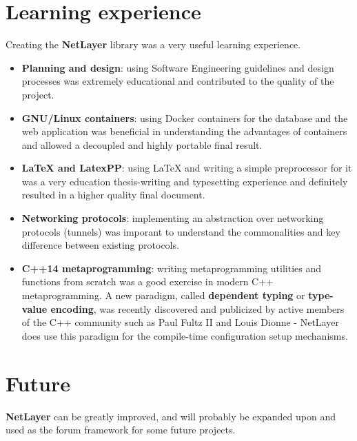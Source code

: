 \documentclass[11pt]{report}
\newcommand{\+}{\discretionary{\mbox{\scriptsize$\hookleftarrow$}}{}{}}
\renewcommand\emph{\textbf}
\begin{document}
    \chapter{Learning experience}

        Creating the \emph{NetLayer} library was a very useful learning experience.

        \begin{itemize}
            \item \emph{Planning and design}: using Software Engineering guidelines and design processes was extremely educational and contributed to the quality of the project. 
            
            \item \emph{GNU/Linux containers}: using Docker containers for the database and the web application was beneficial in understanding the advantages of containers and allowed a decoupled and highly portable final result.
            
            \item \emph{\LaTeX{} and LatexPP}: using \LaTeX{} and writing a simple preprocessor for it was a very education thesis-writing and typesetting experience and definitely resulted in a higher quality final document.

            \item \emph{Networking protocols}: implementing an abstraction over networking protocols (tunnels) was imporant to understand the commonalities and key difference between existing protocols.

            \item \emph{C++14 metaprogramming}: writing metaprogramming utilities and functions from scratch was a good exercise in modern C++ metaprogramming. A new paradigm, called \emph{dependent typing} or \emph{type-value encoding}, was recently discovered and publicized by active members of the C++ community such as Paul Fultz II and Louis Dionne - NetLayer does use this paradigm for the compile-time configuration setup mechanisms.
        \end{itemize}

    \chapter{Future}
        
        \emph{NetLayer} can be greatly improved, and will probably be expanded upon and used as the forum framework for some future projects.
\end{document}
